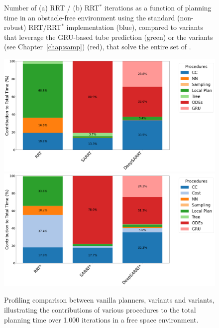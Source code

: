 \begin{figure} [h!]
    \centering
    \caption{Number of (a) RRT / (b) RRT$^*$ iterations as a function of planning time in an obstacle-free environment using the standard (non-robust) RRT/RRT$^*$ implementation (blue), compared to  variants that leverage the GRU-based tube prediction (green) or the  variants (see Chapter~\ref{chap:samp}) (red), that solve the entire set of .}%
    \label{fig: NNTime}%
\end{figure}

\begin{figure} [h!]
    \centering
    \includegraphics[width=0.8\linewidth]{figures/robust_accurate/profiling_rrt.png}%
    \\
    \includegraphics[width=0.8\linewidth]{figures/robust_accurate/profiling_rrtstar.png}%
    \caption{Profiling comparison between vanilla planners,  variants and  variants, illustrating the contributions of various procedures to the total planning time over 1.000 iterations in a free space environment.}%
    \label{fig:NNProfiling}%
\end{figure}

